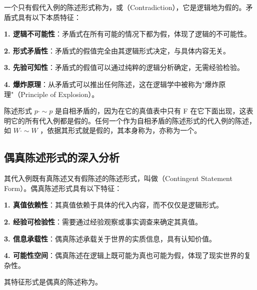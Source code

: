 \begin{theorembox}[title=矛盾式的本质特征]
一个只有假代入例的陈述形式称为，或（Contradiction），它是逻辑地为假的。矛盾式具有以下本质特征：

\textbf{1. 逻辑不可能性}：矛盾式在所有可能的情况下都为假，体现了逻辑的不可能性。

\textbf{2. 形式矛盾性}：矛盾式的假值完全由其逻辑形式决定，与具体内容无关。

\textbf{3. 先验可知性}：矛盾式的假值可以通过纯粹的逻辑分析确定，无需经验检验。

\textbf{4. 爆炸原理}：从矛盾式可以推出任何陈述，这在逻辑学中被称为"爆炸原理"（Principle of Explosion）。
\end{theorembox}

陈述形式 $p \cdot \sim p$ 是自相矛盾的，因为在它的真值表中只有 F 在它下面出现，这表明它的所有代入例都是假的。任何一个作为自相矛盾的陈述形式的代入例的陈述，如 $W \cdot \sim W$ ，依据其形式就是假的，其本身称为，亦称为一个。

\subsection{偶真陈述形式的深入分析}

\begin{theorembox}[title=偶真陈述形式的特征]
其代入例既有真陈述又有假陈述的陈述形式，叫做（Contingent Statement Form）。偶真陈述形式具有以下特征：

\textbf{1. 真值依赖性}：其真值依赖于具体的代入内容，而不仅仅是逻辑形式。

\textbf{2. 经验可检验性}：需要通过经验观察或事实调查来确定其真值。

\textbf{3. 信息承载性}：偶真陈述承载关于世界的实质信息，具有认知价值。

\textbf{4. 可能性空间}：偶真陈述在逻辑上既可能为真也可能为假，体现了现实世界的复杂性。
\end{theorembox}

其特征形式是偶真的陈述称为。\cite{whitehead1911}

